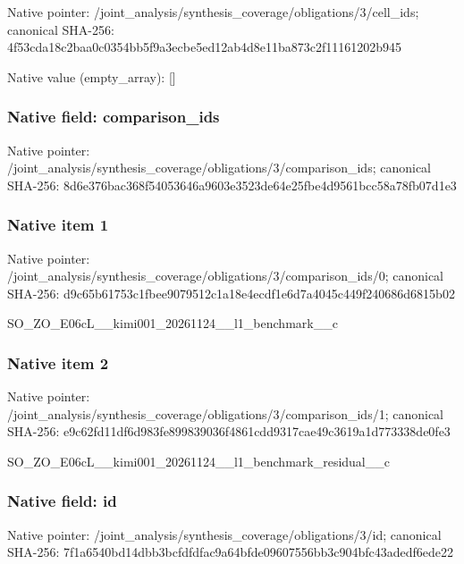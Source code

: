 \documentclass[10pt,a4paper]{article}
\begin{document}
Native pointer: /joint\_analysis/synthesi\allowbreak{}s\_coverage/obligations/3\allowbreak{}/cell\_ids; canonical SHA-256: 4f53cda18c2baa0c0354bb5f\allowbreak{}9a3ecbe5ed12ab4d8e11ba87\allowbreak{}3c2f11161202b945



Native value (empty\_array): []



\subsubsection{Native field: comparison\_ids}


Native pointer: /joint\_analysis/synthesi\allowbreak{}s\_coverage/obligations/3\allowbreak{}/comparison\_ids; canonical SHA-256: 8d6e376bac368f54053646a9\allowbreak{}603e3523de64e25fbe4d9561\allowbreak{}bcc58a78fb07d1e3



\subsubsection{Native item 1}


Native pointer: /joint\_analysis/synthesi\allowbreak{}s\_coverage/obligations/3\allowbreak{}/comparison\_ids/0; canonical SHA-256: d9c65b61753c1fbee9079512\allowbreak{}c1a18e4ecdf1e6d7a4045c44\allowbreak{}9f240686d6815b02


SO\_ZO\_E06cL\_\_kimi001\_202\allowbreak{}61124\_\_l1\_benchmark\_\_c


\subsubsection{Native item 2}


Native pointer: /joint\_analysis/synthesi\allowbreak{}s\_coverage/obligations/3\allowbreak{}/comparison\_ids/1; canonical SHA-256: e9c62fd11df6d983fe899839\allowbreak{}036f4861cdd9317cae49c361\allowbreak{}9a1d773338de0fe3


SO\_ZO\_E06cL\_\_kimi001\_202\allowbreak{}61124\_\_l1\_benchmark\_resi\allowbreak{}dual\_\_c


\subsubsection{Native field: id}


Native pointer: /joint\_analysis/synthesi\allowbreak{}s\_coverage/obligations/3\allowbreak{}/id; canonical SHA-256: 7f1a6540bd14dbb3bcfdfdfa\allowbreak{}c9a64bfde09607556bb3c904\allowbreak{}bfc43adedf6ede22
\end{document}
